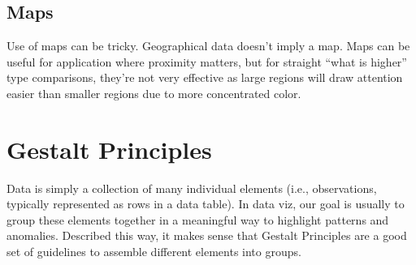 \documentclass[]{book}
\theoremstyle{definition}
\theoremstyle{definition}
\theoremstyle{definition}
\theoremstyle{remark}
\begin{document}
\subsection{Maps}\label{maps}

Use of maps can be tricky. Geographical data doesn't imply a map. Maps
can be useful for application where proximity matters, but for straight
``what is higher'' type comparisons, they're not very effective as large
regions will draw attention easier than smaller regions due to more
concentrated color.

\section{Gestalt Principles}\label{gestalt-principles}

Data is simply a collection of many individual elements (i.e.,
observations, typically represented as rows in a data table). In data
viz, our goal is usually to group these elements together in a
meaningful way to highlight patterns and anomalies. Described this way,
it makes sense that Gestalt Principles are a good set of guidelines to
assemble different elements into groups.
\end{document}
